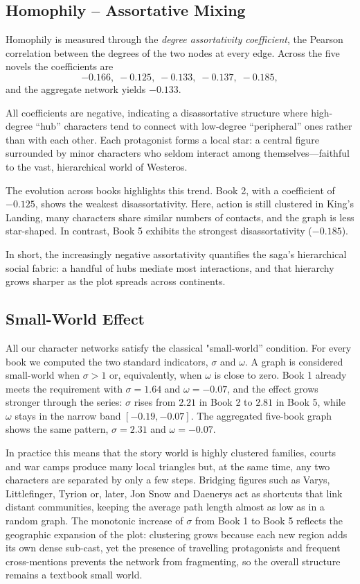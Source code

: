 \documentclass[12pt, a4paper]{article}
\begin{document}
	\subsection*{Homophily – Assortative Mixing}
	
	Homophily is measured through the \emph{degree assortativity coefficient}, the Pearson correlation between the degrees of the two nodes at every edge.  
	Across the five novels the coefficients are
	\[
	-0.166,\;-0.125,\;-0.133,\;-0.137,\;-0.185,
	\]
	and the aggregate network yields \(-0.133\).

	All coefficients are negative, indicating a disassortative structure where high-degree ``hub'' characters tend to connect with low-degree ``peripheral'' ones rather than with each other. Each protagonist forms a local star: a central figure surrounded by minor characters who seldom interact among themselves—faithful to the vast, hierarchical world of Westeros.

	The evolution across books highlights this trend. Book 2, with a coefficient of \(-0.125\), shows the weakest disassortativity. Here, action is still clustered in King's Landing, many characters share similar numbers of contacts, and the graph is less star-shaped. In contrast, Book 5 exhibits the strongest disassortativity (\(-0.185\)).
  

	In short, the increasingly negative assortativity quantifies the saga's hierarchical social fabric: a handful of hubs mediate most interactions, and that hierarchy grows sharper as the plot spreads across continents.
	\subsection*{Small-World Effect} 
	
	All our character networks satisfy the classical "small-world'' condition.
	For every book we computed the two standard indicators, 
	$\sigma$ and $\omega$.
	A graph is considered small-world when $\sigma>1$ or, equivalently, when $\omega$ is close to zero.
	Book 1 already meets the requirement with $\sigma=1.64$ and $\omega=-0.07$, and the effect grows stronger through the series: $\sigma$ rises from $2.21$ in Book 2 to $2.81$ in Book 5, while $\omega$ stays in the narrow band $[-0.19,-0.07]$.
	The aggregated five-book graph shows the same pattern, $\sigma=2.31$ and $\omega=-0.07$.
	
	In practice this means that the story world is highly clustered families, 
	courts and war camps produce many local triangles but, at the same time, 
	any two characters are separated by only a few steps. 
	Bridging figures such as Varys, Littlefinger, 
	Tyrion or, later, Jon Snow and Daenerys act as 
	shortcuts that link distant communities, keeping the average path length almost as low 
	as in a random graph.  The monotonic increase of $\sigma$ from Book 1 to Book 5 reflects
	the geographic expansion of the plot: clustering grows because each new region adds its
	own dense sub-cast, yet the presence of travelling protagonists and frequent cross-mentions
	prevents the network from fragmenting, so the overall structure remains a textbook small world.
	
\end{document}
